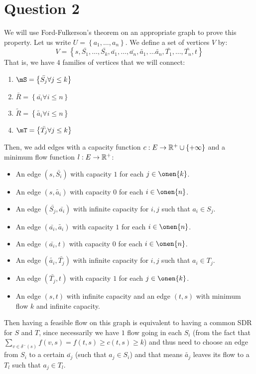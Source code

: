 \documentclass[math]{cours}
\def\bR{\bar{R}}
\def\tR{\tilde{R}}
\begin{document}
\section{Question 2}
We will use Ford-Fulkerson's theorem on an appropriate graph to prove this property.
Let us write $U = \left\{a_{1}, \ldots, a_{n} \right\}$.
We define a set of vertices $V$ by:
\begin{equation*}
	V = \left\{s, \bar{S_{1}}, \ldots, \bar{S_{k}}, \bar{a_{1}}, \ldots, \bar{a_{n}}, \tilde{a_{1}}, \ldots \tilde{a_{n}}, \bar{T_{1}}, \ldots, \bar{T_{n}}, t\right\}
\end{equation*}
That is, we have $4$ families of vertices that we will connect:
\begin{enumerate}
	\item $\mS = \left\{\bar{S_{j}} \forall j \leq k \right\}$
	\item $\bR = \left\{\bar{a_{i}} \forall i \leq n \right\}$
	\item $\tR = \left\{\tilde{a_{i}}\forall i \leq n \right\}$
	\item $\mT = \left\{\bar{T_{j}}\forall j \leq k \right\}$
\end{enumerate}
Then, we add edges with a capacity function $c: E \to \mathbb{R}^{+} \cup \{+\infty\}$ and a minimum flow function $l: E \to \mathbb{R}^{+}$:
\begin{itemize}
	\item An edge $(s, \bar{S_{i}})$ with capacity $1$ for each $j \in \onen{k}$.
	\item An edge $(s, \tilde{a_{i}})$ with capacity $0$ for each $i \in \onen{n}$.
	\item An edge $(\bar{S_{j}}, \bar{a_{i}})$ with infinite capacity for $i, j$ such that $a_{i} \in S_{j}$.
	\item An edge $(\bar{a_{i}}, \tilde{a_{i}})$ with capacity $1$ for each $i \in \onen{n}$.
	\item An edge $(\bar{a_{i}}, t)$ with capacity $0$ for each $i \in \onen{n}$.
	\item An edge $(\tilde{a_{i}}, \bar{T_{j}})$ with infinite capacity for $i, j$ such that $a_{i} \in T_{j}$.
	\item An edge $(\bar{T_{j}}, t)$ with capacity $1$ for each $j\in \onen{k}$.
	\item An edge $(s, t)$ with infinite capacity and an edge $(t, s)$ with minimum flow $k$ and infinite capacity.
\end{itemize}
Then having a feasible flow on this graph is equivalent to having a common SDR for $S$ and $T$,
	since necessarily we have $1$ flow going in each $S_{i}$ (from the fact that $\sum_{v \in \delta^{-}(s)} f(v, s) = f(t, s) \geq c(t, s) \geq k$)
	and thus need to choose an edge from $S_{i}$ to a certain $\bar{a_{j}}$ (such that $a_{j} \in S_{i}$)
	and that means $\tilde{a_{j}}$ leaves its flow to a $T_{l}$ such that $a_{j} \in T_{l}$.
\end{document}
